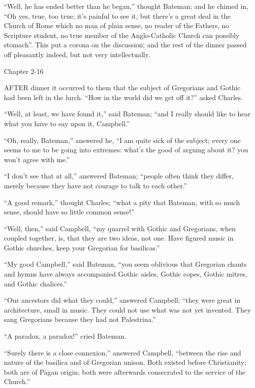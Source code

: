 ``Well, he has ended better than he began,'' thought
Bateman; and he chimed in, ``Oh yes, true, too true; it's painful
to see it, but there's a great deal in the Church of Rome which no man
of plain sense, no reader of the Fathers, no Scripture student,
no true member of the Anglo-Catholic Church can possibly
stomach''. This put a corona on the discussion; and the rest of
the dinner passed off pleasantly indeed, but not very intellectually.

Chapter 2-16


AFTER dinner it occurred to them that
the subject of Gregorians and Gothic had been left in the lurch.
``How in the world did we get off it?'' asked Charles.

``Well, at least, we have found it,'' said Bateman;
``and I really should like to hear what you have to say upon it,
Campbell.''

``Oh, really, Bateman,'' answered he, ``I am quite sick
of the subject; every one seems to me to be going into extremes: what's
the good of arguing about it? you won't agree with me.''

``I don't see that at all,'' answered Bateman; ``people
often think they differ, merely because they have not courage to talk
to each other.''

``A good remark,'' thought Charles; ``what a pity that
Bateman, with so much sense, should have so little common sense!''

``Well, then,'' said Campbell, ``my quarrel with Gothic
and Gregorians, when coupled together, is, that they are two ideas,
not one. Have figured music in Gothic churches, keep your Gregorian
for basilicas.''

``My good Campbell,'' said Bateman, ``you seem
oblivious that Gregorian chants and hymns have always accompanied Gothic aisles, Gothic copes, Gothic mitres, and Gothic
chalices.''

``Our ancestors did what they could,'' answered Campbell;
``they were great in architecture, small in music. They could not
use what was not yet invented. They sang Gregorians because they had
not Palestrina.''

``A paradox, a paradox!'' cried Bateman.

``Surely there is a close connexion,'' answered Campbell,
``between the rise and nature of the basilica and of Gregorian
unison. Both existed before Christianity; both are of Pagan origin;
both were afterwards consecrated to the service of the Church.''

